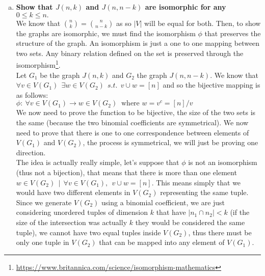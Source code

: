\begin{enumerate}[a)]
\begin{center}
\end{center} 
    \boldmath
    \item \textbf{Show that $J(n, k)$ and $J(n, n-k)$ are isomorphic for any $0 \leq k \leq n.$} \\ 
    \linebreak 
    \unboldmath
    We know that $\binom{n}{k} = \binom{n}{n-k}$ as so $|V|$ will be equal for both. Then, to show the graphs are isomorphic, we must find the isomorphism $\phi$ that preserves the structure of the graph. An isomorphism is just a one to one mapping between two sets. Any binary relation defined on the set is preserved through the isomorphism\footnote{\href{https://www.britannica.com/science/isomorphism-mathematics}{https://www.britannica.com/science/isomorphism-mathematics}}.\\
    \linebreak 
    Let $G_1$ be the graph $J(n,k)$ and $G_2$ the graph $J(n, n-k)$. We know that $\forall v \in V(G_1) \:\: \exists w \in V(G_2) \:\: s.t.\:\: v \cup w = [n]$  and so the bijective mapping is as follows: \\
    \linebreak 
    $\phi : \: \forall v \in V(G_1) \rightarrow w \in V(G_2) \: \text{ where } w = v^c = [n]/v $ \\
    \linebreak
    We now need to prove the function to be bijective, the size of the two sets is the same (because the two binomial coefficients are symmetrical). We now need to prove that there is one to one correspondence between elements of $V(G_1)$ and $V(G_2)$, the process is symmetrical, we will just be proving one direction.\\
    \linebreak
    The idea is actually really simple, let's suppose that $\phi$ is not an isomorphism (thus not a bijection), that means that there is more than one element $w \in V(G_2) \:\: | \:\: \forall v \in V(G_1), \:\: v \cup w = [n]$.
    This means simply that we would have two different elements in $V(G_2)$ representing the same tuple. Since we generate $V(G_2)$ using a binomial coefficient, we are just considering unordered tuples of dimension $k$ that have $|n_1 \cap n_2| < k$ (if the size of the intersection was actually $k$ they would be considered the same tuple), we cannot have two equal tuples inside $V(G_2)$, thus there must be only one tuple in $V(G_2)$ that can be mapped into any element of $V(G_1)$.\\

\end{enumerate}
